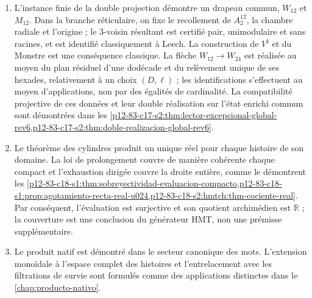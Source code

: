 \begin{enumerate}
\item L'instance finie de la double projection démontre un drapeau commun,
\(W_{12}\) et \(M_{12}\). Dans la branche réticulaire, on fixe le recollement de
\(A_2^{12}\), la chambre radiale et l'origine ; le 3-voisin résultant est certifié
pair, unimodulaire et sans racines, et est identifié classiquement à Leech. La
construction de \(V^\natural\) et du Monstre est une conséquence classique. La
flèche \(W_{12}\to W_{24}\) est réalisée au moyen du plan résiduel d'une
dodécade et du relèvement unique de ses hexades, relativement à un choix
\((D,\ell)\) ; les identifications s'effectuent au moyen d'applications, non
par des égalités de cardinalité. La compatibilité projective de ces
données et leur double réalisation sur l'état enrichi commun sont démontrées
dans les
\cref{p12-83-c17-s2:thm:lector-excepcional-global-rev6,p12-83-c17-s2:thm:doble-realizacion-global-rev6}.

\item Le théorème des cylindres produit un unique réel pour chaque histoire de son
domaine. La loi de prolongement couvre de manière cohérente chaque compact et
l'exhaustion dirigée couvre la droite entière, comme le démontrent les
\cref{p12-83-c18-s1:thm:sobreyectividad-evaluacion-compacto,p12-83-c18-s1:prop:agotamiento-recta-real-u024,p12-83-c18-s2:hmtch:thm-cociente-real}.
Par conséquent, l'évaluation est surjective et son quotient archimédien est
\(\mathbb R\) ; la couverture est une conclusion du générateur HMT, non une
prémisse supplémentaire.

\item Le produit natif est démontré dans le secteur canonique des mots.
L'extension monoïdale à l'espace complet des histoires et l'entrelacement
avec les filtrations de survie sont formulés comme des applications distinctes
dans le \cref{chap:producto-nativo}.
\end{enumerate}
